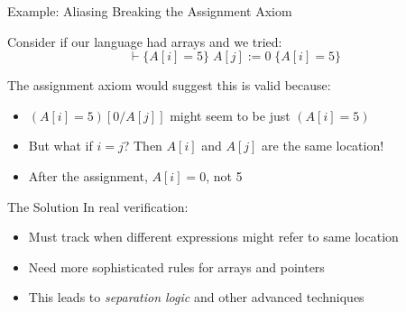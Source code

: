 \begin{frame}{Example: Aliasing Breaking the Assignment Axiom}
    \begin{example}
        Consider if our language had arrays and we tried:
        \[ \vdash \{A[i] = 5\} \; A[j] := 0 \; \{A[i] = 5\} \]
        
        The assignment axiom would suggest this is valid because:
        \begin{itemize}
            \item $(A[i] = 5)[0/A[j]]$ might seem to be just $(A[i] = 5)$
            \item But what if $i = j$? Then $A[i]$ and $A[j]$ are the same location!
            \item After the assignment, $A[i] = 0$, not 5
        \end{itemize}
    \end{example}
    
    \begin{block}{The Solution}
        In real verification:
        \begin{itemize}
            \item Must track when different expressions might refer to same location
            \item Need more sophisticated rules for arrays and pointers
            \item This leads to \emph{separation logic} and other advanced techniques
        \end{itemize}
    \end{block}
\end{frame}